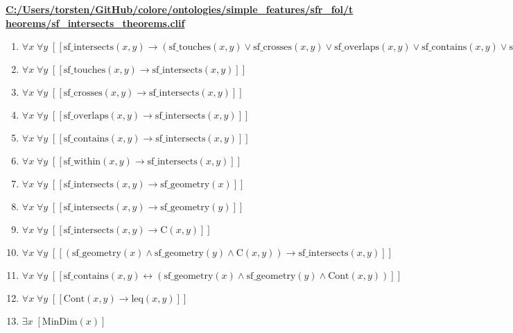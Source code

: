 \documentclass{article}
\begin{document}
\textbf{\url{C:/Users/torsten/GitHub/colore/ontologies/simple\_features/sfr\_fol/theorems/sf\_intersects\_theorems.clif}}

\begin{enumerate}
\item $\forall x\; \forall y\;  \left[ \left[ \textrm{sf\_intersects}(x,y) \rightarrow \left(\textrm{sf\_touches}(x,y) \lor \textrm{sf\_crosses}(x,y) \lor \textrm{sf\_overlaps}(x,y) \lor \textrm{sf\_contains}(x,y) \lor \textrm{sf\_within}(x,y)\right) \right] \right]$
\item $\forall x\; \forall y\;  \left[ \left[ \textrm{sf\_touches}(x,y) \rightarrow \textrm{sf\_intersects}(x,y) \right] \right]$
\item $\forall x\; \forall y\;  \left[ \left[ \textrm{sf\_crosses}(x,y) \rightarrow \textrm{sf\_intersects}(x,y) \right] \right]$
\item $\forall x\; \forall y\;  \left[ \left[ \textrm{sf\_overlaps}(x,y) \rightarrow \textrm{sf\_intersects}(x,y) \right] \right]$
\item $\forall x\; \forall y\;  \left[ \left[ \textrm{sf\_contains}(x,y) \rightarrow \textrm{sf\_intersects}(x,y) \right] \right]$
\item $\forall x\; \forall y\;  \left[ \left[ \textrm{sf\_within}(x,y) \rightarrow \textrm{sf\_intersects}(x,y) \right] \right]$
\item $\forall x\; \forall y\;  \left[ \left[ \textrm{sf\_intersects}(x,y) \rightarrow \textrm{sf\_geometry}(x) \right] \right]$
\item $\forall x\; \forall y\;  \left[ \left[ \textrm{sf\_intersects}(x,y) \rightarrow \textrm{sf\_geometry}(y) \right] \right]$
\item $\forall x\; \forall y\;  \left[ \left[ \textrm{sf\_intersects}(x,y) \rightarrow \textrm{C}(x,y) \right] \right]$
\item $\forall x\; \forall y\;  \left[ \left[ \left(\textrm{sf\_geometry}(x) \land \textrm{sf\_geometry}(y) \land \textrm{C}(x,y)\right) \rightarrow \textrm{sf\_intersects}(x,y) \right] \right]$
\item $\forall x\; \forall y\;  \left[ \left[ \textrm{sf\_contains}(x,y) \leftrightarrow \left(\textrm{sf\_geometry}(x) \land \textrm{sf\_geometry}(y) \land \textrm{Cont}(x,y)\right) \right] \right]$
\item $\forall x\; \forall y\;  \left[ \left[ \textrm{Cont}(x,y) \rightarrow \textrm{leq}(x,y) \right] \right]$
\item $\exists x\;  \left[ \textrm{MinDim}(x) \right]$

\end{enumerate}
\end{document}
